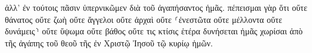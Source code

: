 \documentclass{openreader}
\begin{document}
ἀλλ’ ἐν τούτοις πᾶσιν ὑπερνικῶμεν διὰ τοῦ ἀγαπήσαντος ἡμᾶς. 
πέπεισμαι γὰρ ὅτι οὔτε θάνατος οὔτε ζωὴ οὔτε ἄγγελοι οὔτε ἀρχαὶ οὔτε ⸂ἐνεστῶτα οὔτε μέλλοντα οὔτε δυνάμεις⸃ 
οὔτε ὕψωμα οὔτε βάθος οὔτε τις κτίσις ἑτέρα δυνήσεται ἡμᾶς χωρίσαι ἀπὸ τῆς ἀγάπης τοῦ θεοῦ τῆς ἐν Χριστῷ Ἰησοῦ τῷ κυρίῳ ἡμῶν. 
\end{document}
